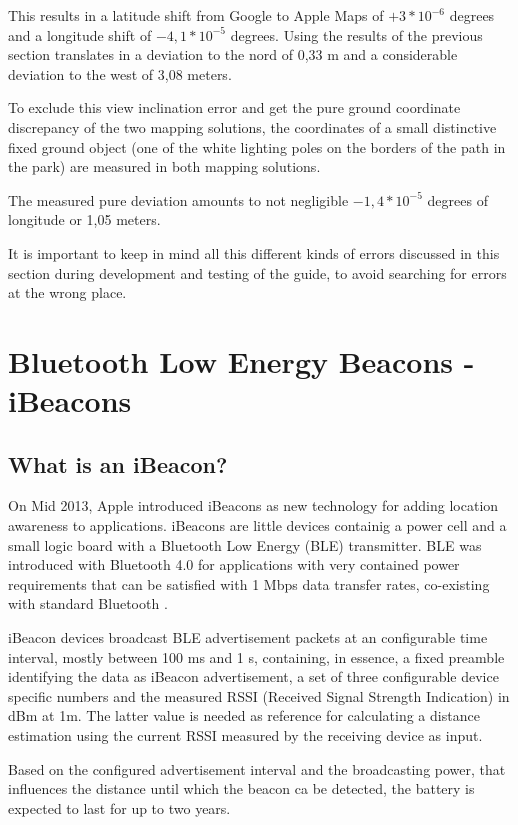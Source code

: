 This results in a latitude shift from Google to Apple Maps of \(+3 * 10^{-6}\) degrees and a longitude shift of \(-4,1 * 10^{-5}\) degrees. Using the results of the previous section translates in a deviation to the nord of 0,33 m and a considerable deviation to the west of 3,08 meters.

To exclude this view inclination error and get the pure ground coordinate discrepancy of the two mapping solutions, the coordinates of a small distinctive fixed ground object (one of the white lighting poles on the borders of the path in the park) are measured in both mapping solutions.

The measured pure deviation amounts to not negligible \(-1,4 * 10^{-5}\) degrees of longitude or 1,05 meters.

It is important to keep in mind all this different kinds of errors discussed in this section during development and testing of the guide, to avoid searching for errors at the wrong place.

\section{Bluetooth Low Energy Beacons - iBeacons}

\label{ibeacons}

\subsection{What is an iBeacon?}

On Mid 2013, Apple introduced iBeacons as new technology for adding location awareness to applications. iBeacons are little devices containig a power cell and a small logic board with a Bluetooth Low Energy (BLE) transmitter. BLE was introduced with Bluetooth 4.0 for applications with very contained power requirements that can be satisfied with 1 Mbps data transfer rates, co-existing with standard Bluetooth \cite{ble}.

iBeacon devices broadcast BLE advertisement packets at an configurable time interval, mostly between 100 ms and 1 s, containing, in essence, a fixed preamble identifying the data as iBeacon advertisement, a set of three configurable device specific numbers and the measured RSSI (Received Signal Strength Indication) in dBm at 1m. The latter value is needed as reference for calculating a distance estimation using the current RSSI measured by the receiving device as input.

Based on the configured advertisement interval and the broadcasting power, that influences the distance until which the beacon ca be detected, the battery is expected to last for up to two years.


